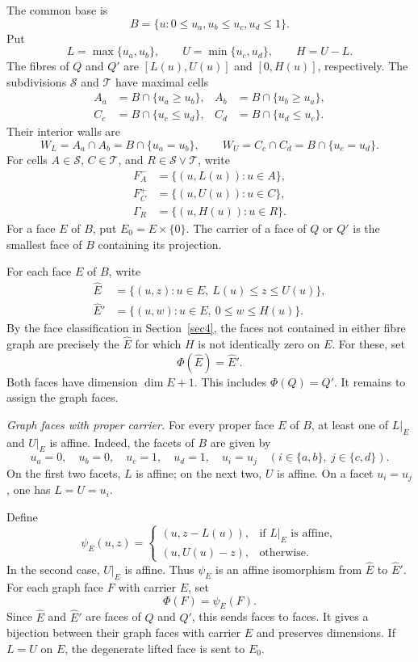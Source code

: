 \documentclass[a4paper,12pt]{amsart}
\theoremstyle{definition}
\theoremstyle{remark}
\begin{document}
The common base is
\[
 B=\{u:0\leq u_a,u_b\leq u_c,u_d\leq1\}.
\]
Put
\[
 L=\max\{u_a,u_b\},\qquad U=\min\{u_c,u_d\},\qquad H=U-L.
\]
The fibres of $Q$ and $Q'$ are $[L(u),U(u)]$ and $[0,H(u)]$, respectively.
The subdivisions $\mathcal S$ and $\mathcal T$ have maximal cells
\[
 \begin{aligned}
 A_a&=B\cap\{u_a\geq u_b\},& A_b&=B\cap\{u_b\geq u_a\},\\
 C_c&=B\cap\{u_c\leq u_d\},& C_d&=B\cap\{u_d\leq u_c\}.
 \end{aligned}
\]
Their interior walls are
\[
 W_L=A_a\cap A_b=B\cap\{u_a=u_b\},\qquad W_U=C_c\cap C_d=B\cap\{u_c=u_d\}.
\]
For cells $A\in\mathcal S$, $C\in\mathcal T$, and $R\in\mathcal S\vee\mathcal T$, write
\[
 \begin{aligned}
 F_A^-&=\{(u,L(u)):u\in A\},\\
 F_C^+&=\{(u,U(u)):u\in C\},\\
 \Gamma_R&=\{(u,H(u)):u\in R\}.
 \end{aligned}
\]
For a face $E$ of $B$, put $E_0=E\times\{0\}$.
The carrier of a face of $Q$ or $Q'$ is the smallest face of $B$ containing its projection.

For each face $E$ of $B$, write
\[
 \begin{aligned}
 \widehat E&=\{(u,z):u\in E,\ L(u)\leq z\leq U(u)\},\\
 \widehat E'&=\{(u,w):u\in E,\ 0\leq w\leq H(u)\}.
 \end{aligned}
\]
By the face classification in Section~\ref{sec4}, the faces not contained in either fibre graph are precisely the $\widehat E$ for which $H$ is not identically zero on $E$.
For these, set
\[
 \Phi(\widehat E)=\widehat E'.
\]
Both faces have dimension $\dim E+1$.
This includes $\Phi(Q)=Q'$.
It remains to assign the graph faces.

\smallskip
\noindent\emph{Graph faces with proper carrier.}
For every proper face $E$ of $B$, at least one of $L|_E$ and $U|_E$ is affine.
Indeed, the facets of $B$ are given by
\[
 u_a=0,\quad u_b=0,\quad u_c=1,\quad u_d=1,\quad u_i=u_j\quad(i\in\{a,b\},\ j\in\{c,d\}).
\]
On the first two facets, $L$ is affine; on the next two, $U$ is affine.
On a facet $u_i=u_j$, one has $L=U=u_i$.

Define
\[
 \psi_E(u,z)=
 \begin{cases}
  (u,z-L(u)),&\text{if $L|_E$ is affine},\\
  (u,U(u)-z),&\text{otherwise}.
 \end{cases}
\]
In the second case, $U|_E$ is affine.
Thus $\psi_E$ is an affine isomorphism from $\widehat E$ to $\widehat E'$.
For each graph face $F$ with carrier $E$, set
\[
 \Phi(F)=\psi_E(F).
\]
Since $\widehat E$ and $\widehat E'$ are faces of $Q$ and $Q'$, this sends faces to faces.
It gives a bijection between their graph faces with carrier $E$ and preserves dimensions.
If $L=U$ on $E$, the degenerate lifted face is sent to $E_0$.
\end{document}
